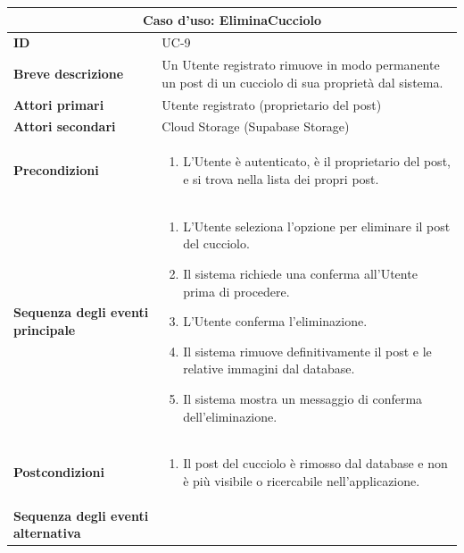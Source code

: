 \documentclass[a4paper]{report}
\begin{document}
\begin{table}[H]
\vspace*{-0cm}
\renewcommand{\arraystretch}{1.9}
\begin{tabular}{|p{3.9cm}|p{9.9cm}|}
\hline
\multicolumn{2}{|c|}{\textbf{Caso d’uso: EliminaCucciolo}} \\ \hline
\textbf{ID} & UC-9 \\ \hline
\textbf{Breve descrizione} & Un Utente registrato rimuove in modo permanente un post di un cucciolo di sua proprietà dal sistema. \\ \hline
\textbf{Attori primari} & Utente registrato (proprietario del post) \\ \hline
\textbf{Attori secondari} & Cloud Storage (Supabase Storage)
 \\ \hline
\textbf{Precondizioni} & \begin{enumerate}[leftmargin=14pt,label=\arabic*.,labelsep=0.5em,topsep=0pt,partopsep=0pt,parsep=0pt,itemsep=0pt]
   \item L'Utente è autenticato, è il proprietario del post, e si trova nella lista dei propri post.
\end{enumerate} \\ \hline
\textbf{Sequenza degli eventi principale} &
\begin{enumerate}[leftmargin=14pt,label=\arabic*.,labelsep=0.5em,topsep=0pt,partopsep=0pt,parsep=0pt,itemsep=0pt]
  \item L'Utente seleziona l'opzione per eliminare il post del cucciolo.
  \item Il sistema richiede una conferma all'Utente prima di procedere.
  \item L'Utente conferma l'eliminazione.
  \item Il sistema rimuove definitivamente il post e le relative immagini dal database.
  \item Il sistema mostra un messaggio di conferma dell'eliminazione.
\end{enumerate}\\ \hline
\textbf{Postcondizioni} &
\begin{enumerate}[leftmargin=14pt,label=\arabic*.,labelsep=0.5em,topsep=0pt,partopsep=0pt,parsep=0pt,itemsep=0pt]
\item Il post del cucciolo è rimosso dal database e non è più visibile o ricercabile nell'applicazione.
\end{enumerate} \\ \hline
\textbf{Sequenza degli eventi alternativa} & \begin{enumerate}[leftmargin=14pt,label=\arabic*.,labelsep=0.5em,topsep=0pt,partopsep=0pt,parsep=0pt,itemsep=0pt]

\end{enumerate}
\end{tabular}
\end{table}
\end{document}
